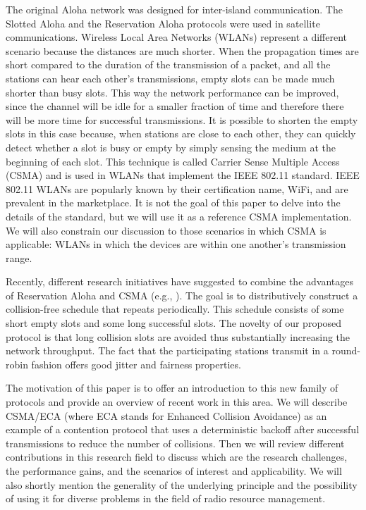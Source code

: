 \documentclass[journal]{IEEEtran}
\begin{document}
The original Aloha network was designed for inter-island communication.
The Slotted Aloha and the Reservation Aloha protocols were used in satellite communications.
Wireless Local Area Networks (WLANs) represent a different scenario because the distances are much shorter.
When the propagation times are short compared to the duration of the transmission of a packet, and all the stations can hear each other's transmissions, empty slots can be made much shorter than busy slots.
This way the network performance can be improved, since the channel will be idle for a smaller fraction of time and therefore there will be more time for successful transmissions.
It is possible to shorten the empty slots in this case because, when stations are close to each other, they can quickly detect whether a slot is busy or empty by simply sensing the medium at the beginning of each slot.
This technique is called Carrier Sense Multiple Access (CSMA) and is used in WLANs that implement the IEEE 802.11 standard.
IEEE 802.11 WLANs are popularly known by their certification name, WiFi, and are prevalent in the marketplace.
It is not the goal of this paper to delve into the details of the standard, but we will use it as a reference CSMA implementation.
We will also constrain our discussion to those scenarios in which CSMA is applicable: WLANs in which the devices are within one another's transmission range.

Recently, different research initiatives have suggested to combine the advantages of Reservation Aloha and CSMA (e.g., \cite{barcelo2008lba,he2009srb,barcelo2010fcc,fang2011dlm,barcelo2011tcf,martorell2012pec}). 
The goal is to distributively construct a collision-free schedule that repeats periodically.
This schedule consists of some short empty slots and some long successful slots.
The novelty of our proposed protocol is that long collision slots are avoided thus substantially increasing the network throughput.
The fact that the participating stations transmit in a round-robin fashion offers good jitter and fairness properties.

The motivation of this paper is to offer an introduction to this new family of protocols and provide an overview of recent work in this area.
We will describe CSMA/ECA (where ECA stands for Enhanced Collision Avoidance) as an example of a contention protocol that uses a deterministic backoff after successful transmissions to reduce the number of collisions.
Then we will review different contributions in this research field to discuss  which are the research challenges, the performance gains, and the scenarios of interest and applicability.
We will also shortly mention the generality of the underlying principle and the possibility of using it for diverse problems in the field of radio resource management.
\end{document}
